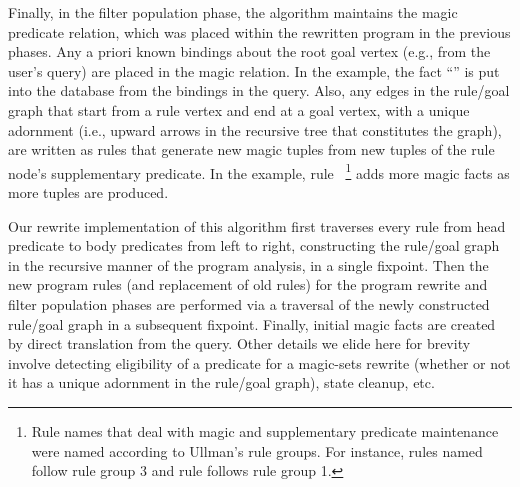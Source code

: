 Finally, in the filter population phase, the algorithm maintains the
magic predicate relation, which was placed within the rewritten program
in the previous phases.  Any a priori known bindings about the root goal vertex
(e.g., from the user's query) are 
placed in the magic relation. In the example, the fact ``'' is put into the
database from the bindings in the  query.  Also, any edges in
the rule/goal graph that start from a rule vertex and end at a goal vertex, with a
unique adornment (i.e., upward arrows in the recursive tree that constitutes the graph), are written as
rules that generate new magic tuples from new tuples of the rule
node's supplementary predicate. In the example, rule ~\footnote{Rule names that
deal with magic and supplementary predicate maintenance were named according
to Ullman's rule groups. For instance, rules named  follow rule group 3
and rule  follows rule group 1.}  adds
more magic facts as more  tuples are produced.

Our rewrite implementation of this algorithm first traverses every rule
from head predicate to body predicates from left to right, constructing
the rule/goal graph in the recursive manner of the program analysis, in
a single fixpoint.  Then the new program rules (and replacement of old
rules) for the program rewrite and filter population phases are
performed via a traversal of the newly constructed rule/goal graph in a
subsequent fixpoint. Finally, initial magic facts are created by direct
translation from the query.  Other details we elide here for brevity
involve detecting eligibility of a predicate for a magic-sets rewrite
(whether or not it has a unique adornment in the rule/goal graph), state
cleanup, etc. 

